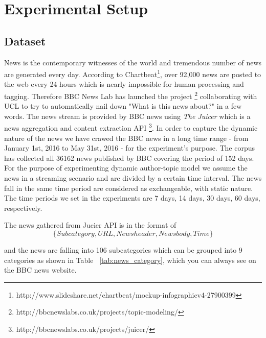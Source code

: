 \chapter{Experimental Setup}
\label{chapterlabel4}





\section{Dataset}\label{dataset}
News is the contemporary witnesses of the world and tremendous number of news are generated every day. According to Chartbeat\footnote{http://www.slideshare.net/chartbeat/mockup-infographicv4-27900399}, over 92,000 news are posted to the web every 24 hours which is nearly impossible for human processing and tagging. Therefore BBC News Lab has launched the project \footnote{http://bbcnewslabs.co.uk/projects/topic-modeling/} collaborating with UCL to try to automatically nail down "What is this news about?" in a few words. 
The news stream is provided by BBC news using \textit{The Juicer} which is a news aggregation and content extraction API \footnote{http://bbcnewslabs.co.uk/projects/juicer/}. In order to capture the dynamic nature of the news we have crawed the BBC news in a long time range - from January 1st, 2016 to May 31st, 2016 - for the experiment's purpose.
The corpus has collected all 36162 news published by BBC covering the period of 152 days. For the purpose of experimenting dynamic author-topic model we assume the news in a streaming scenario and are divided by a certain time interval. The news fall in the same time period are considered as exchangeable, with static nature. The time periods we set in the experiments are 7 days, 14 days, 30 days, 60 days, respectively. 

The news gathered from Jucier API is in the format of 
\begin{equation}\label{apiformat}
\{Subcategory, URL, News header, News body, Time\}
\end{equation}

and the news are falling into 106 subcategories which can be grouped into 9 categories as shown in Table ~\ref{tab:news_category}, which you can always see on the BBC news website. 


